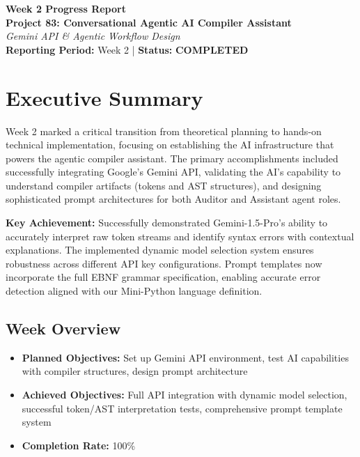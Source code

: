 \documentclass[a4paper,11pt]{article}
\newcommand{\statusgood}[1]{\colorbox{green!20}{\textbf{#1}}}
\begin{document}
\begin{center}
    {\huge \textbf{Week 2 Progress Report}} \\
    \vspace{3mm}
    {\large \textbf{Project 83: Conversational Agentic AI Compiler Assistant}} \\
    \vspace{2mm}
    \textit{Gemini API \& Agentic Workflow Design} \\
    \vspace{2mm}
    \textbf{Reporting Period:} Week 2 | \textbf{Status:} \statusgood{COMPLETED}
\end{center}

\vspace{5mm}

\section{Executive Summary}

Week 2 marked a critical transition from theoretical planning to hands-on technical implementation, focusing on establishing the AI infrastructure that powers the agentic compiler assistant. The primary accomplishments included successfully integrating Google's Gemini API, validating the AI's capability to understand compiler artifacts (tokens and AST structures), and designing sophisticated prompt architectures for both Auditor and Assistant agent roles.

\textbf{Key Achievement:} Successfully demonstrated Gemini-1.5-Pro's ability to accurately interpret raw token streams and identify syntax errors with contextual explanations. The implemented dynamic model selection system ensures robustness across different API key configurations. Prompt templates now incorporate the full EBNF grammar specification, enabling accurate error detection aligned with our Mini-Python language definition.

\subsection{Week Overview}

\begin{itemize}[leftmargin=*]
    \item \textbf{Planned Objectives:} Set up Gemini API environment, test AI capabilities with compiler structures, design prompt architecture
    \item \textbf{Achieved Objectives:} Full API integration with dynamic model selection, successful token/AST interpretation tests, comprehensive prompt template system
    \item \textbf{Completion Rate:} 100\%
\end{itemize}
\end{document}
